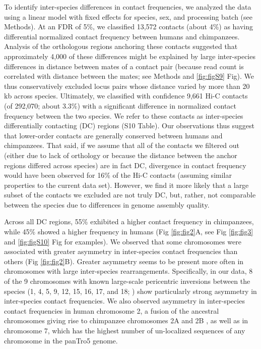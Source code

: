 To identify inter-species differences in contact frequencies, we analyzed the data using a linear model with fixed effects for species, sex, and processing batch (see Methods). At an FDR of 5\%, we classified 13,572 contacts (about 4\%) as having differential normalized contact frequency between humans and chimpanzees. Analysis of the orthologous regions anchoring these contacts suggested that approximately 4,000 of these differences might be explained by large inter-species differences in distance between mates of a contact pair (because read count is correlated with distance between the mates; see Methods and \ref{fig:figS9} Fig). We thus conservatively excluded locus pairs whose distance varied by more than 20 kb across species. Ultimately, we classified with confidence 9,661 Hi-C contacts (of 292,070; about 3.3\%) with a significant difference in normalized contact frequency between the two species. We refer to these contacts as inter-species differentially contacting (DC) regions (S10 Table). Our observations thus suggest that lower-order contacts are generally conserved between humans and chimpanzees. That said, if we assume that all of the contacts we filtered out (either due to lack of orthology or because the distance between the anchor regions differed across species) are in fact DC, divergence in contact frequency would have been observed for 16\% of the Hi-C contacts (assuming similar properties to the current data set). However, we find it more likely that a large subset of the contacts we excluded are not truly DC, but, rather, not comparable between the species due to differences in genome assembly quality.

Across all DC regions, 55\% exhibited a higher contact frequency in chimpanzees, while 45\% showed a higher frequency in humans (Fig \ref{fig:fig2}A, see Fig \ref{fig:fig3} and \ref{fig:figS10} Fig for examples). We observed that some chromosomes were associated with greater asymmetry in inter-species contact frequencies than others (Fig \ref{fig:fig2}B). Greater asymmetry seems to be present more often in chromosomes with large inter-species rearrangements. Specifically, in our data, 8 of the 9 chromosomes with known large-scale pericentric inversions between the species (1, 4, 5, 9, 12, 15, 16, 17, and 18; \cite{Yunis.1982, Yunis.1980, Kehrer-Sawatzki.2005, Nickerson.1998, Waterson.2005, Dennehey.2004}) show particularly strong asymmetry in inter-species contact frequencies. We also observed asymmetry in inter-species contact frequencies in human chromosome 2, a fusion of the ancestral chromosomes giving rise to chimpanzee chromosomes 2A and 2B \cite{Waterson.2005}, as well as in chromosome 7, which has the highest number of un-localized sequences of any chromosome in the panTro5 genome.

